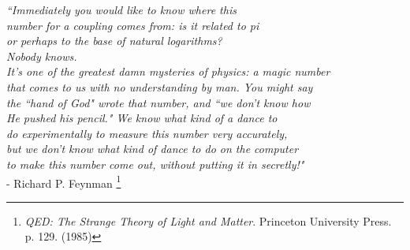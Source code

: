\vfill

\begin{flushright}
\singlespacing
\emph{
``Immediately you would like to know where this \\
number for a coupling comes from: is it related to pi\\
or perhaps to the base of natural logarithms? \\
Nobody knows.\\
It's one of the greatest damn mysteries of physics: a magic number \\
that comes to us with no understanding by man. You might say \\
the ``hand of God" wrote that number, and ``we don't know how\\
He pushed his pencil." We know what kind of a dance to\\
do experimentally to measure this number very accurately,\\
but we don't know what kind of dance to do on the computer\\
to make this number come out, without putting it in secretly!"}\\
- Richard P.
Feynman \footnote{\emph{QED: The Strange Theory of Light and Matter}.
	Princeton University Press.	p.	129.	(1985)}
\end{flushright}
\onehalfspacing
